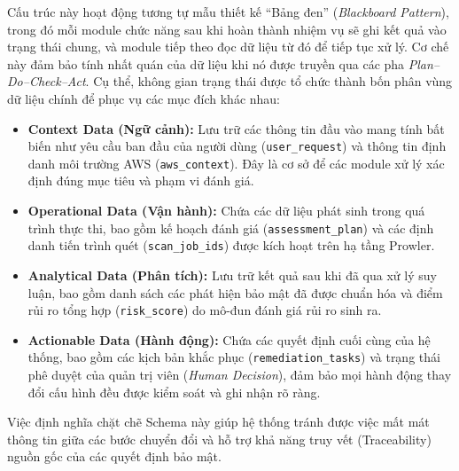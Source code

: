 Cấu trúc này hoạt động tương tự
mẫu thiết kế ``Bảng đen''
(\textit{Blackboard Pattern}),
trong đó mỗi module chức năng
sau khi hoàn thành nhiệm vụ
sẽ ghi kết quả vào trạng thái chung,
và module tiếp theo
đọc dữ liệu từ đó để tiếp tục xử lý.
Cơ chế này đảm bảo tính nhất quán của dữ liệu
khi nó được truyền qua các pha
\textit{Plan--Do--Check--Act}. Cụ thể, không gian trạng thái được tổ chức thành bốn phân vùng dữ liệu chính để phục vụ các mục đích khác nhau:

\begin{itemize}
  \item \textbf{Context Data (Ngữ cảnh):}
    Lưu trữ các thông tin đầu vào mang tính bất biến
    như yêu cầu ban đầu của người dùng
    (\texttt{user\_request})
    và thông tin định danh môi trường AWS
    (\texttt{aws\_context}).
    Đây là cơ sở để các module xử lý
    xác định đúng mục tiêu và phạm vi đánh giá.

  \item \textbf{Operational Data (Vận hành):}
    Chứa các dữ liệu phát sinh trong quá trình thực thi,
    bao gồm kế hoạch đánh giá
    (\texttt{assessment\_plan})
    và các định danh tiến trình quét
    (\texttt{scan\_job\_ids})
    được kích hoạt trên hạ tầng Prowler.

  \item \textbf{Analytical Data (Phân tích):}
    Lưu trữ kết quả sau khi đã qua xử lý suy luận,
    bao gồm danh sách các phát hiện bảo mật
    đã được chuẩn hóa
    và điểm rủi ro tổng hợp
    (\texttt{risk\_score})
    do mô-đun đánh giá rủi ro sinh ra.

  \item \textbf{Actionable Data (Hành động):}
    Chứa các quyết định cuối cùng của hệ thống,
    bao gồm các kịch bản khắc phục
    (\texttt{remediation\_tasks})
    và trạng thái phê duyệt của quản trị viên
    (\textit{Human Decision}),
    đảm bảo mọi hành động thay đổi cấu hình
    đều được kiểm soát và ghi nhận rõ ràng.
\end{itemize}

Việc định nghĩa chặt chẽ Schema này giúp hệ thống tránh được việc mất mát thông tin giữa các bước chuyển đổi và hỗ trợ khả năng truy vết (Traceability) nguồn gốc của các quyết định bảo mật.

